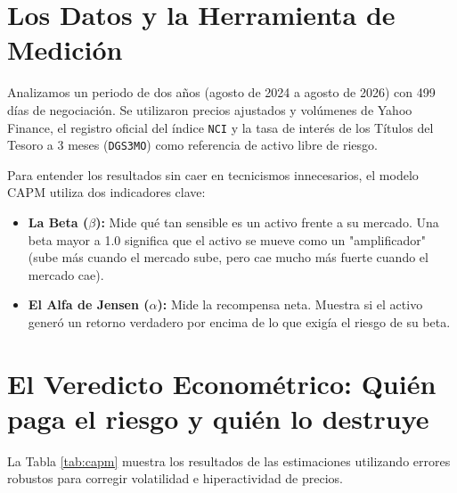 \documentclass[11pt,a4paper]{article}
\begin{document}
\section{Los Datos y la Herramienta de Medición}

Analizamos un periodo de dos años (agosto de 2024 a agosto de 2026) con 499 días de negociación. Se utilizaron precios ajustados y volúmenes de Yahoo Finance, el registro oficial del índice \texttt{NCI} y la tasa de interés de los Títulos del Tesoro a 3 meses (\texttt{DGS3MO}) como referencia de activo libre de riesgo.

Para entender los resultados sin caer en tecnicismos innecesarios, el modelo CAPM utiliza dos indicadores clave:
\begin{itemize}[leftmargin=*]
    \item \textbf{La Beta ($\beta$):} Mide qué tan sensible es un activo frente a su mercado. Una beta mayor a 1.0 significa que el activo se mueve como un "amplificador" (sube más cuando el mercado sube, pero cae mucho más fuerte cuando el mercado cae).
    \item \textbf{El Alfa de Jensen ($\alpha$):} Mide la recompensa neta. Muestra si el activo generó un retorno verdadero por encima de lo que exigía el riesgo de su beta.
\end{itemize}

\section{El Veredicto Econométrico: Quién paga el riesgo y quién lo destruye}

La Tabla \ref{tab:capm} muestra los resultados de las estimaciones utilizando errores robustos para corregir volatilidad e hiperactividad de precios.
\end{document}
